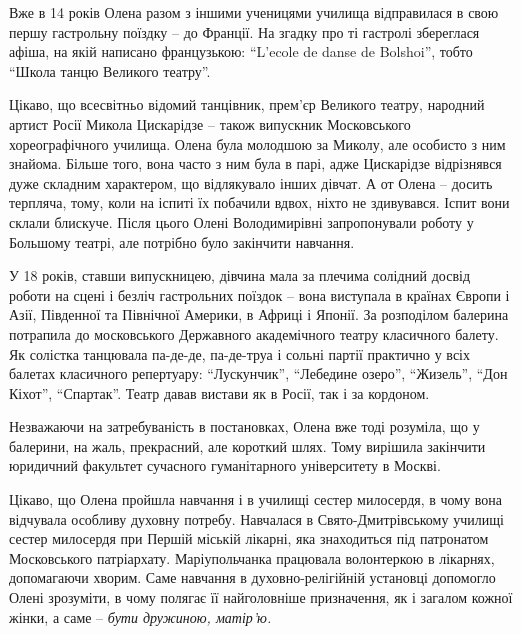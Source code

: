 
Вже в 14 років Олена разом з іншими ученицями училища відправилася в свою першу
гастрольну поїздку – до Франції. На згадку про ті гастролі збереглася афіша, на
якій написано французькою: \enquote{L'ecole de danse de Bolshoi}, тобто \enquote{Школа танцю
Великого театру}.

Цікаво, що всесвітньо відомий танцівник, прем'єр Великого театру, народний
артист Росії Микола Цискарідзе – також випускник Московського хореографічного
училища. Олена була молодшою за Миколу, але особисто з ним знайома. Більше
того, вона часто з ним була в парі, адже Цискарідзе відрізнявся дуже складним
характером, що відлякувало інших дівчат. А от Олена – досить терпляча, тому,
коли на іспиті їх побачили вдвох, ніхто не здивувався. Іспит вони склали
блискуче. Після цього Олені Володимирівні запропонували роботу у Большому
театрі, але потрібно було закінчити навчання.

У 18 років, ставши випускницею, дівчина мала за плечима солідний досвід роботи
на сцені і безліч гастрольних поїздок – вона виступала в країнах Європи і Азії,
Південної та Північної Америки, в Африці і Японії. За розподілом балерина
потрапила до московського Державного академічного театру класичного балету. Як
солістка танцювала па-де-де, па-де-труа і сольні партії практично у всіх
балетах класичного репертуару: \enquote{Лускунчик}, \enquote{Лебедине озеро}, \enquote{Жизель}, \enquote{Дон
Кіхот}, \enquote{Спартак}. Театр давав вистави як в Росії, так і за кордоном.

Незважаючи на затребуваність в постановках, Олена вже тоді розуміла, що у
балерини, на жаль, прекрасний, але короткий шлях. Тому вирішила закінчити
юридичний факультет сучасного гуманітарного університету в Москві.


Цікаво, що Олена пройшла навчання і в училищі сестер милосердя, в чому вона
відчувала особливу духовну потребу. Навчалася в Свято-Дмитрівському училищі
сестер милосердя при Першій міській лікарні, яка знаходиться під патронатом
Московського патріархату. Маріупольчанка працювала волонтеркою в лікарнях,
допомагаючи хворим. Саме навчання в духовно-релігійній установці допомогло
Олені зрозуміти, в чому полягає її найголовніше призначення, як і загалом
кожної жінки, а саме – \emph{бути дружиною, матір'ю.}


